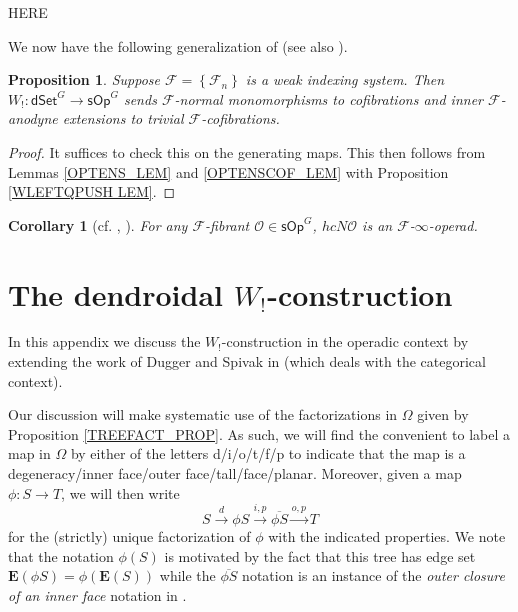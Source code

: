 \documentclass[a4paper,10pt
,draft
]{article}%
\numberwithin{equation}{section}
\numberwithin{figure}{section}
\newtheorem{proposition}[equation]{Proposition}%
\newtheorem{corollary}[equation]{Corollary}%
\theoremstyle{definition} %
\newcommand{\set}[1]{\left\{#1\right\}}%
\newcommand{\sOp}{\ensuremath{\mathsf{sOp}}}%
\newcommand{\dSet}{\mathsf{dSet}}
\newcommand{\F}{\ensuremath{\mathcal F}}
\renewcommand{\O}{\ensuremath{\mathcal O}}
\newcommand{\1}{\ensuremath{\mathbbm 1}}%
\begin{document}
{\color{red} HERE}




We now have the following generalization of \cite[Prop 4.5]{CM13b} (see also \cite[Prop. 6.15]{Per18}).


\begin{proposition}
	\label{W!_COF_PROP}
	Suppose $\F = \set{\F_n}$ is a weak indexing system.
	Then $W_!: \dSet^G \to \sOp^G$ sends $\F$-normal monomorphisms to cofibrations and inner $\F$-anodyne extensions to trivial $\F$-cofibrations.
\end{proposition}

\begin{proof}
	It suffices to check this on the generating maps.
	This then follows from
	Lemmas \ref{OPTENS_LEM} and \ref{OPTENSCOF_LEM} with Proposition \ref{WLEFTQPUSH LEM}.
\end{proof}




\begin{corollary}
	[{cf. \cite[Prop. 6.15]{Per18}, \cite[Cor. 4.6]{CM11}}]
	For any $\F$-fibrant $\O \in \sOp^G$, $h c N \O$ is an $\F$-$\infty$-operad.
\end{corollary}









\newpage
\appendix







\section{The dendroidal $W_!$-construction}
\label{WCONS AP}



In this appendix we discuss the 
$W_!$-construction in the operadic context by extending the  
work of Dugger and Spivak in \cite{DS11} 
(which deals with the categorical context).


Our discussion will make systematic
use of the factorizations in $\Omega$ given by 
Proposition \ref{TREEFACT_PROP}.
As such, we will find the convenient to label a 
map in $\Omega$
by either of the letters d/i/o/t/f/p
to indicate that the map is
a degeneracy/inner face/outer face/tall/face/planar.
Moreover, given a map $\phi\colon S \to T$,
we will then write
\[
	S \xrightarrow{d}
	\phi S \xrightarrow{i,p}
	\overline{\phi S} \xrightarrow{o,p}
	T
\]
for the (strictly) unique 
factorization of $\phi$ with the indicated properties.
We note that the notation 
$\phi(S)$ is motivated by the fact that this tree has edge set
$\boldsymbol{E}(\phi S) = \phi (\boldsymbol{E}(S))$
while the 
$\overline{\phi S}$ notation is an instance of the 
\emph{outer closure of an inner face}
notation in \cite[Not. 2.14]{BP_edss}.
\end{document}
